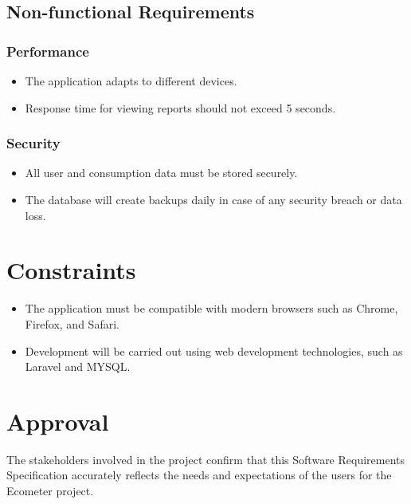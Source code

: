 \documentclass[conference]{IEEEtran}
\begin{document}
\subsection{Non-functional Requirements}

\subsubsection{Performance}

\begin{itemize}
    \item The application adapts to different devices.
    \item Response time for viewing reports should not exceed 5 seconds.
\end{itemize}

\subsubsection{Security}

\begin{itemize}
    \item All user and consumption data must be stored securely.
    \item The database will create backups daily in case of any security breach or data loss.
\end{itemize}

\section{Constraints}

\begin{itemize}
    \item The application must be compatible with modern browsers such as Chrome, Firefox, and Safari.
    \item Development will be carried out using web development technologies, such as Laravel and MYSQL.
\end{itemize}

\section{Approval}

The stakeholders involved in the project confirm that this Software Requirements Specification accurately reflects the needs and expectations of the users for the Ecometer project.
\end{document}
